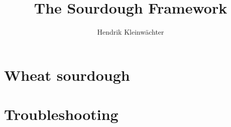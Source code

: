 \documentclass[paper=a4, twoside=false, fontsize=12pt, parskip=half,
                bibliography=totoc, listof=totoc]{scrbook}
\author{Hendrik Kleinwächter}
\title{The Sourdough Framework}
\begin{document}

\titlepage

\frontmatter
{%
\hypersetup{hidelinks}
\ifdefined\HCode\else\tableofcontents\fi
}





\mainmatter













\chapter{Wheat sourdough}%
\label{chapter:wheat-sourdough}










\chapter{Troubleshooting}


\backmatter

{%
\hypersetup{hidelinks}
\listofflowcharts
\listoftables
\listoffigures
}
\printbibliography
\end{document}
